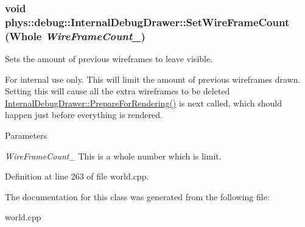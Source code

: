 \hypertarget{classphys_1_1debug_1_1InternalDebugDrawer_a76922fda7bb3b59d301e50d67e4f3c72}{
\subsubsection[{SetWireFrameCount}]{\setlength{\rightskip}{0pt plus 5cm}void phys::debug::InternalDebugDrawer::SetWireFrameCount ({\bf Whole} {\em WireFrameCount\_\-})}}
\label{db/d27/classphys_1_1debug_1_1InternalDebugDrawer_a76922fda7bb3b59d301e50d67e4f3c72}


Sets the amount of previous wireframes to leave visible. 

\begin{DoxyInternal}{For internal use only.}
This will limit the amount of previous wireframes drawn. Setting this will cause all the extra wireframes to be deleted \hyperlink{classphys_1_1debug_1_1InternalDebugDrawer_a1002293d223ca20e5bccc3c3412ce262}{InternalDebugDrawer::PrepareForRendering()} is next called, which should happen just before everything is rendered. 
\begin{DoxyParams}{Parameters}
\item[{\em WireFrameCount\_\-}]This is a whole number which is limit. \end{DoxyParams}
\end{DoxyInternal}


Definition at line 263 of file world.cpp.



The documentation for this class was generated from the following file:\begin{DoxyCompactItemize}
\item 
world.cpp\end{DoxyCompactItemize}

